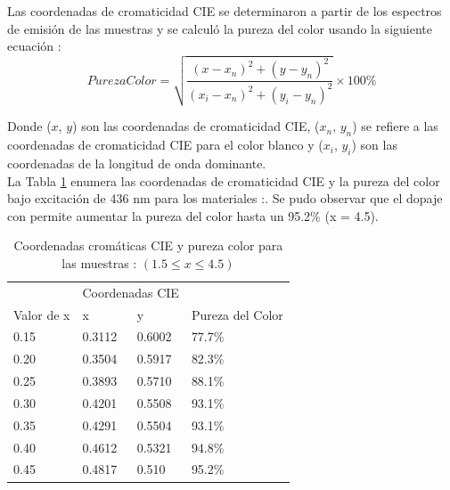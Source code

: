 Las coordenadas de cromaticidad CIE se determinaron a partir de los espectros
de emisión de las muestras y se calculó la pureza del color usando la siguiente
ecuación \cite{KaviRasu2017}:\\

\begin{equation}
    PurezaColor = \sqrt{\frac{(x-x_n)^2+(y-y_n)^2}{(x_i-x_n)^2+(y_i-y_n)^2}}
    \times 100\%
    \label{eqn:eq5}
\end{equation}

Donde ($x$, $y$) son las coordenadas de cromaticidad CIE, ($x_n$, $y_n$) se
refiere a las coordenadas de cromaticidad CIE para el color blanco y ($x_i$,
$y_i$) son las
coordenadas de la longitud de onda dominante.\\

La Tabla \ref{tab:croma} enumera las coordenadas de cromaticidad CIE
y la pureza del color bajo excitación de 436 nm para los materiales
:. Se pudo observar que el dopaje con
 permite aumentar
la pureza del color hasta un 95.2\% (x = 4.5).\\

\begin{table}[]
    \centering
    \caption{Coordenadas cromáticas CIE y pureza color para las muestras : $(1.5\leq x\leq 4.5)$}
    \label{tab:croma}
    \begin{tabular}{llll}
    \hline
         & \multicolumn{2}{l}{Coordenadas CIE} &       \\ \cline{2-3}
    \multirow{-2}{*}{Valor de x} & x & y & \multirow{-2}{*}{Pureza del Color} \\ \hline
    0.15 & 0.3112           & 0.6002           & 77.7\% \\
     
    0.20 & 0.3504           & 0.5917           & 82.3\% \\
    0.25 & 0.3893           & 0.5710           & 88.1\% \\
     
    0.30 & 0.4201           & 0.5508           & 93.1\% \\
    0.35 & 0.4291           & 0.5504           & 93.1\% \\
     
    0.40 & 0.4612           & 0.5321           & 94.8\% \\
    0.45 & 0.4817           & 0.510            & 95.2\% \\ \hline
    \end{tabular}
    \end{table}

